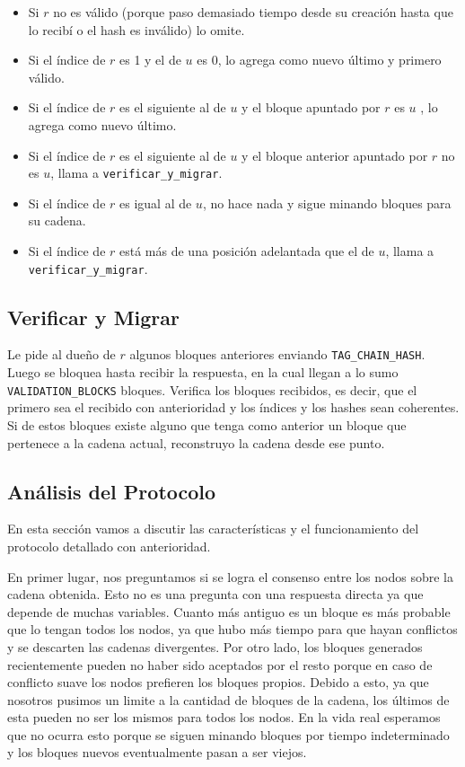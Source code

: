 \begin{itemize}
	\item Si $r$ no es válido (porque paso demasiado tiempo desde su creación hasta que lo recibí o el hash es inválido) lo omite.
	\item Si el índice de $r$ es 1 y el de $u$ es 0, lo agrega como nuevo último y primero válido.
	\item Si el índice de $r$ es el siguiente al de $u$ y el bloque apuntado por $r$ es $u$ , lo agrega como nuevo último.
	\item Si el índice de $r$ es el siguiente al de $u$ y el bloque anterior apuntado por $r$ no es $u$, llama a \texttt{verificar\_y\_migrar}.
	\item Si el índice de $r$ es igual al de $u$, no hace nada y sigue minando bloques para su cadena.
	\item Si el índice de $r$ está más de una posición adelantada que el de $u$, llama a \texttt{verificar\_y\_migrar}.
\end{itemize}


\subsection{Verificar y Migrar}

Le pide al dueño de $r$ algunos bloques anteriores enviando \texttt{TAG\_CHAIN\_HASH}. Luego 
se bloquea hasta recibir la respuesta, en la cual llegan a lo sumo \texttt{VALIDATION\_BLOCKS}  bloques.
Verifica los bloques recibidos, es decir, que el primero sea el recibido con anterioridad y los índices y los hashes sean coherentes.
Si de estos bloques existe alguno que tenga como anterior un bloque que pertenece a la cadena actual, reconstruyo la cadena desde ese punto.


\subsection{Análisis del Protocolo}
En esta sección vamos a discutir las características y el funcionamiento del protocolo detallado con anterioridad.

En primer lugar, nos preguntamos si se logra el consenso entre los nodos sobre la cadena obtenida. Esto no es una pregunta con una respuesta directa ya que depende de muchas variables. Cuanto más antiguo es un bloque es más probable que lo tengan todos los nodos, ya que hubo más tiempo para que hayan conflictos y se descarten las cadenas divergentes. Por otro lado, los bloques generados recientemente pueden no haber sido aceptados por el resto porque en caso de conflicto suave los nodos prefieren los bloques propios. Debido a esto, ya que nosotros pusimos un limite a la cantidad de bloques de la cadena, los últimos de esta pueden no ser los mismos para todos los nodos. En la vida real esperamos que no ocurra esto porque se siguen minando bloques por tiempo indeterminado y los bloques nuevos eventualmente pasan a ser viejos. 

